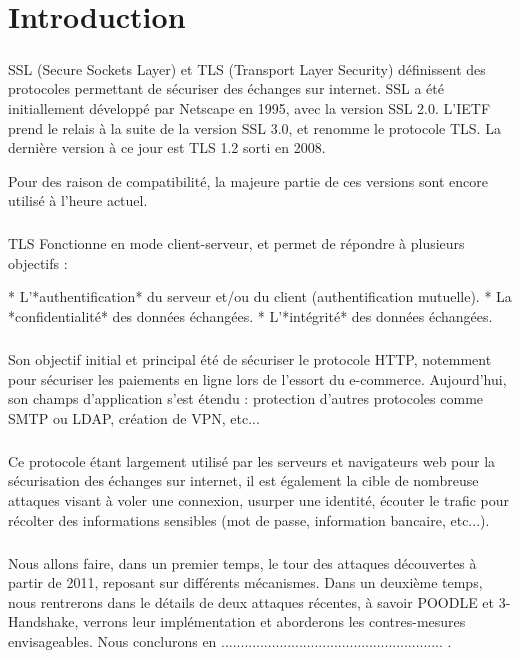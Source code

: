 \chapter*{Introduction}

\paragraph{}
SSL (Secure Sockets Layer) et TLS (Transport Layer Security) définissent des protocoles permettant de sécuriser des échanges sur internet. SSL a été initiallement développé par Netscape en 1995, avec la version SSL 2.0. L'IETF prend le relais à la suite de la version SSL 3.0, et renomme le protocole TLS. La dernière version à ce jour est TLS 1.2 sorti en 2008.

Pour des raison de compatibilité, la majeure partie de ces versions sont encore utilisé à l'heure actuel.

\paragraph{}
TLS Fonctionne en mode client-serveur, et permet de répondre à plusieurs objectifs :

* L'*authentification* du serveur et/ou du client (authentification mutuelle).
* La *confidentialité* des données échangées.
* L'*intégrité* des données échangées.

\paragraph{}
Son objectif initial et principal été de sécuriser le protocole HTTP, notemment pour sécuriser les paiements en ligne lors de l'essort du e-commerce. Aujourd'hui, son champs d'application s'est étendu : protection d'autres protocoles comme SMTP ou LDAP, création de VPN, etc...

\paragraph{}
Ce protocole étant largement utilisé par les serveurs et navigateurs web pour la sécurisation des échanges sur internet, il est également la cible de nombreuse attaques visant à voler une connexion, usurper une identité, écouter le trafic pour récolter des informations sensibles (mot de passe, information bancaire, etc...).

\paragraph{}
Nous allons faire, dans un premier temps, le tour des attaques découvertes à partir de 2011, reposant sur différents mécanismes. Dans un deuxième temps, nous rentrerons dans le détails de deux attaques récentes, à savoir POODLE et 3-Handshake, verrons leur implémentation et aborderons les contres-mesures envisageables. Nous conclurons en ......................................................... .